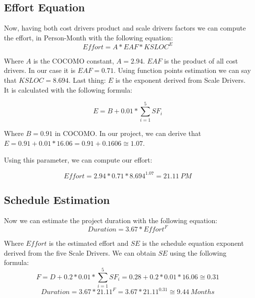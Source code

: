 \pagebreak
\subsection{Effort Equation} %
\label{sub:effort_equation}

Now, having both cost drivers product and scale drivers factors we can compute
the effort, in Person-Month with the following equation:
$$ Effort = A * EAF * KSLOC^E $$

Where $A$ is the COCOMO constant, $ A = 2.94 $. $EAF$ is the product of
all cost drivers. In our case it is $ EAF = 0.71 $. Using function points estimation
we can say that $ KSLOC = 8.694 $.
Last thing: $E$ is the exponent derived from Scale Drivers. It is calculated with
the following formula:

$$ E = B + 0.01 * \sum_{i=1}^5 SF_i $$

Where $ B = 0.91 $ in COCOMO.
In our project, we can derive that $ E = 0.91 + 0.01 * 16.06 = 0.91 + 0.1606 \cong 1.07 $.

Using this parameter, we can compute our effort:

$$ Effort = 2.94 * 0.71 * 8.694^{1.07} = 21.11~PM $$

\subsection{Schedule Estimation}
\label{sub:schedule_estimation}

Now we can estimate the project duration with the following equation:
$$ Duration = 3.67 * Effort^F $$

Where $Effort$ is the estimated effort and $SE$ is the schedule equation exponent derived
from the five Scale Drivers.
We can obtain $SE$ using the following formula:
$$ F = D + 0.2 * 0.01 * \sum_{i=1}^5 SF_i = 0.28 + 0.2 * 0.01 * 16.06 \cong 0.31 $$
$$ Duration = 3.67 * 21.11^F = 3.67 * 21.11^{0.31} \cong 9.44~Months $$

